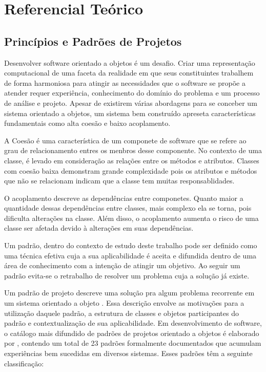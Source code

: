 \chapter{Referencial Teórico}

\section{Princípios e Padrões de Projetos}


Desenvolver software orientado a objetos é um desafio. Criar uma representação
computacional de uma faceta da realidade em que seus constituintes trabalhem de
forma harmoniosa para atingir as necessidades que o software se propõe a
atender requer experiência, conhecimento do domínio do problema e um processo de
análise e projeto. Apesar de existirem várias abordagens para se conceber um
sistema orientado a objetos\cite{evans2004ddd},\cite{gomma11} um sistema bem
construído apreseta características fundamentais como alta coesão e
baixo acoplamento.

A Coesão é uma característica de um componete de software que se refere ao grau
de relacionamento entres os menbros desse componente. No contexto de uma classe,
é levado em consideração as relações entre os métodos e atributos. Classes com
coesão baixa demonstram grande complexidade pois os atributos e métodos que não
se relacionam indicam que a classe tem muitas responsablidades.

O acoplamento descreve as dependências entre componetes. Quanto maior a
quantidade dessas dependências entre classes, mais complexo ela se torna, pois
dificulta  alterações na classe. Além disso, o acoplamento aumenta o risco de
uma classe ser afetada devido à alterações em suas dependências.

Um padrão, dentro do contexto de estudo deste trabalho pode ser definido
como uma técnica efetiva cuja a sua aplicabilidade é aceita e difundida dentro
de uma área de conhecimento com a intenção de atingir um
objetivo\cite{MetskerWake06}. Ao seguir um padrão evita-se o retrabalho de
resolver um problema cuja a solução já existe.

Um padrão de projeto descreve uma solução pra algum problema recorrente em um
sistema orientado a objeto \cite{gof}. Essa descrição envolve as motivações para
a utilização daquele padrão, a estrutura de classes e objetos participantes do
padrão e contextualização de sua aplicabilidade. Em desenvolvimento de software,
o catálogo mais difundido de padrões de projetos orientado a objetos é elaborado
por , contendo um total de 23 padrões formalmente documentados
que acumulam experiências bem sucedidas em diversos sistemas. Esses padrões têm
a seguinte classificação:

